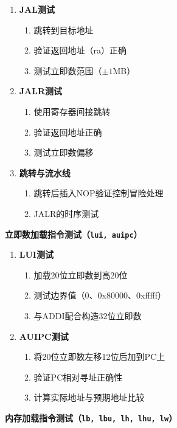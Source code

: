 \documentclass[12pt,a4paper]{ctexart}
\newcommand{\code}[1]{\texttt{#1}}
\begin{document}
\begin{enumerate}
    \item \textbf{JAL测试}
    \begin{enumerate}
        \item 跳转到目标地址
        \item 验证返回地址（ra）正确
        \item 测试立即数范围（$\pm 1$MB）
    \end{enumerate}
    
    \item \textbf{JALR测试}
    \begin{enumerate}
        \item 使用寄存器间接跳转
        \item 验证返回地址正确
        \item 测试立即数偏移
    \end{enumerate}
    
    \item \textbf{跳转与流水线}
    \begin{enumerate}
        \item 跳转后插入NOP验证控制冒险处理
        \item JALR的时序测试
    \end{enumerate}
\end{enumerate}

\textbf{立即数加载指令测试（\code{lui, auipc}）}

\begin{enumerate}
    \item \textbf{LUI测试}
    \begin{enumerate}
        \item 加载20位立即数到高20位
        \item 测试边界值（0、0x80000、0xfffff）
        \item 与ADDI配合构造32位立即数
    \end{enumerate}
    
    \item \textbf{AUIPC测试}
    \begin{enumerate}
        \item 将20位立即数左移12位后加到PC上
        \item 验证PC相对寻址正确性
        \item 计算实际地址与预期地址比较
    \end{enumerate}
\end{enumerate}

\textbf{内存加载指令测试（\code{lb, lbu, lh, lhu, lw}）}
\end{document}
